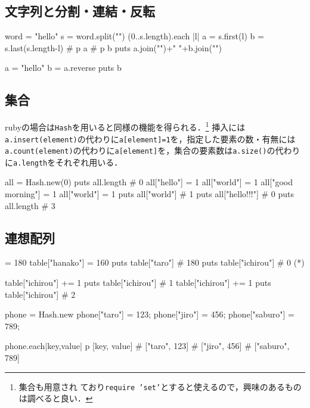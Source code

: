 \subsection{文字列と分割・連結・反転}

\begin{rbox}
word = "hello"
s = word.split("")
(0..s.length).each {|l|
  a = s.first(l)
  b = s.last(s.length-l)
  # p a
  # p b
  puts a.join("")+" "+b.join("")
}  
\end{rbox}

\begin{rbox}
a = "hello"
b = a.reverse
puts b
\end{rbox}

\subsection{集合}

rubyの場合は\texttt{Hash}を用いると同様の機能を得られる．\footnote{集合も用意され
ており\texttt{require 'set'}とすると使えるので，興味のあるものは調べると良い．}
挿入には\texttt{a.insert(element)}の代わりに\texttt{a[element]=1}を，指定した要素の数・有無には\texttt{a.count(element)}の代わりに\texttt{a[element]}を，集合の要素数は\texttt{a.size()}の代わりに\texttt{a.length}をそれぞれ用いる．

\begin{rbox}
all = Hash.new(0)
puts all.length # 0
all["hello"] = 1
all["world"] = 1
all["good morning"] = 1
all["world"] = 1
puts all["world"] # 1
puts all["hello!!!"] # 0
puts all.length # 3
\end{rbox}

\subsection{連想配列}

\begin{rbox}[emph={Hash}
table = Hash.new(0) # keyが存在しない時(*)のvalueを0に指定した
table["taro"] = 180
table["hanako"] = 160
puts table["taro"] # 180
puts table["ichirou"] # 0 (*)
\end{rbox}

\begin{rbox}
table["ichirou"] += 1
puts table["ichirou"] # 1
table["ichirou"] += 1
puts table["ichirou"] # 2  
\end{rbox}


\begin{rbox}
phone = Hash.new
phone["taro"] = 123;
phone["jiro"] = 456;
phone["saburo"] = 789;

phone.each{|key,value|
  p [key, value]
}
# ["taro", 123]
# ["jiro", 456]
# ["saburo", 789]
\end{rbox}


